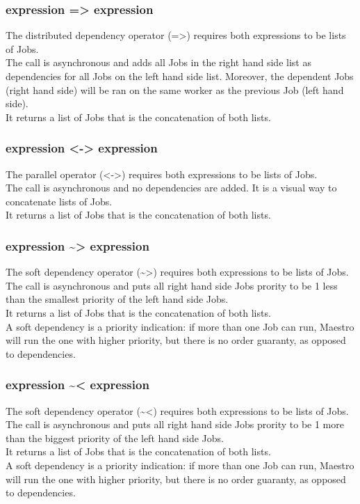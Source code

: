 \documentclass[12pt]{article}
\begin{document}
\subsubsection{expression => expression}
The distributed dependency operator (=>) requires both expressions to be lists of Jobs.\\
The call is asynchronous and adds all Jobs in the right hand side list as dependencies
for all Jobs on the left hand side list. Moreover, the dependent Jobs (right
hand side)  will be ran on the same worker as the previous Job (left hand
side).\\
It returns a list of Jobs that is the concatenation of both lists.

\subsubsection{expression <-> expression}
The parallel operator (<->) requires both expressions to be lists of Jobs.\\
The call is asynchronous and no dependencies are added. It is a visual way to
concatenate lists of Jobs.\\
It returns a list of Jobs that is the concatenation of both lists.

\subsubsection{expression \textasciitilde> expression}
The soft dependency operator (\textasciitilde>) requires both expressions to be lists of Jobs.\\
The call is asynchronous and puts all right hand side Jobs prority to be 1 less than the smallest
priority of the left hand side Jobs.\\
It returns a list of Jobs that is the concatenation of both lists.\\
A soft dependency is a priority indication: if more than one Job can run, Maestro will run the
one with higher priority, but there is no order guaranty, as opposed to dependencies.

\subsubsection{expression \textasciitilde< expression}
The soft dependency operator (\textasciitilde<) requires both expressions to be lists of Jobs.\\
The call is asynchronous and puts all right hand side Jobs prority to be 1 more than the biggest
priority of the left hand side Jobs.\\
It returns a list of Jobs that is the concatenation of both lists.\\
A soft dependency is a priority indication: if more than one Job can run, Maestro will run the
one with higher priority, but there is no order guaranty, as opposed to dependencies.
\end{document}
